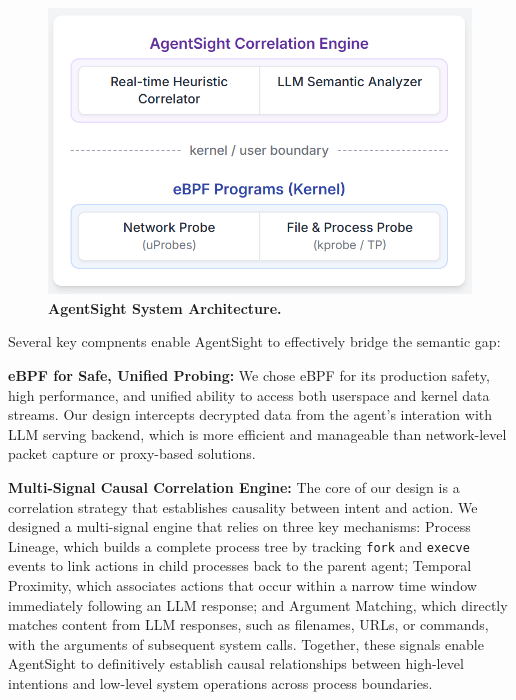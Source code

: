 \begin{figure}[h!]
    \centering
    \includegraphics[width=\columnwidth]{figture/arch.png} %
    \caption{\textbf{AgentSight System Architecture.}}
    \label{fig:architecture}
\end{figure}

Several key compnents enable AgentSight to effectively bridge the semantic gap:

\textbf{eBPF for Safe, Unified Probing:} We chose eBPF for its production safety, high performance, and unified ability to access both userspace and kernel data streams. Our design intercepts decrypted data from the agent's interation with LLM serving backend, which is more efficient and manageable than network-level packet capture or proxy-based solutions.

\textbf{Multi-Signal Causal Correlation Engine:} The core of our design is a correlation strategy that establishes causality between intent and action. We designed a multi-signal engine that relies on three key mechanisms: Process Lineage, which builds a complete process tree by tracking \texttt{fork} and \texttt{execve} events to link actions in child processes back to the parent agent; Temporal Proximity, which associates actions that occur within a narrow time window immediately following an LLM response; and Argument Matching, which directly matches content from LLM responses, such as filenames, URLs, or commands, with the arguments of subsequent system calls. Together, these signals enable AgentSight to definitively establish causal relationships between high-level intentions and low-level system operations across process boundaries.

